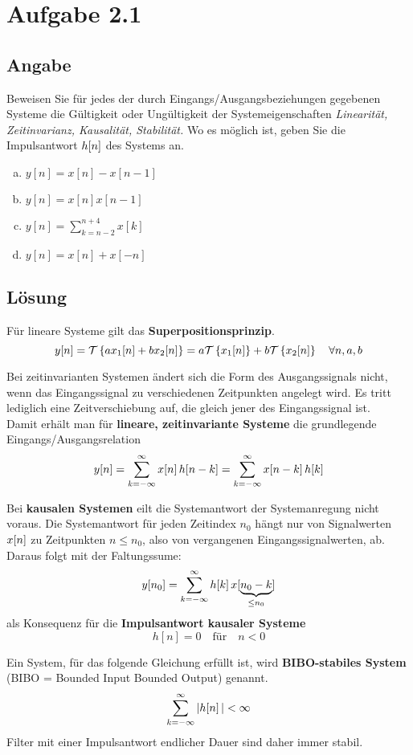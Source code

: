 \section*{Aufgabe 2.1}
\subsection*{Angabe}
Beweisen Sie für jedes der durch Eingangs/Ausgangsbeziehungen gegebenen Systeme die Gültigkeit oder Ungültigkeit der Systemeigenschaften \textit{Linearität, Zeitinvarianz, Kausalität, Stabilität.} Wo es möglich ist, geben Sie die Impulsantwort $h\negthinspace\left[n\right]$ des Systems an.
\begin{enumerate}[a)]
	\item $y[n] = x[n]-x[n-1]$
	\item $y[n] = x[n]x[n-1]$
	\item $\displaystyle{y[n] = \sum_{k=n-2}^{n+4}x[k]}$
	\item $y[n] = x[n] + x[-n]$
\end{enumerate}
\subsection*{Lösung}
\begin{hint}
	Für lineare Systeme gilt das \textbf{Superpositionsprinzip}.\\
	\[
		y\negthinspace\left[n\right] = \mathcal{T} \left\{ ax_1 \negthinspace\left[n\right] + bx_2 \negthinspace\left[n\right] \right\}
		= a\mathcal{T} \left\{ x_1\negthinspace\left[n\right] \right\} + b\mathcal{T} \left\{ x_2 \negthinspace\left[n\right] \right\}
		\quad \forall n,a,b
	\]
\end{hint}
\begin{hint}
	Bei zeitinvarianten Systemen ändert sich die Form des Ausgangssignals nicht, wenn das Eingangssignal zu verschiedenen Zeitpunkten angelegt wird. Es tritt lediglich eine Zeitverschiebung auf, die gleich jener des Eingangssignal ist. \\
	Damit erhält man für \textbf{lineare, zeitinvariante Systeme} die grundlegende\\ Eingangs/Ausgangsrelation
	\[
		y\negthinspace\left[n\right] = \sum_{k=-\infty}^{\infty}x\negthinspace\left[n\right]h\negthinspace\left[n-k\right]
		=\sum_{k=-\infty}^{\infty}x\negthinspace\left[n-k\right]h\negthinspace\left[k\right]
	\]
\end{hint}
\begin{hint}
	Bei \textbf{kausalen Systemen} eilt die Systemantwort der Systemanregung nicht voraus. Die Systemantwort für jeden Zeitindex $n_0$ hängt nur von Signalwerten $x\negthinspace\left[n\right]$ zu Zeitpunkten $n\le n_0$, also von vergangenen Eingangssignalwerten, ab. \\
	Daraus folgt mit der Faltungssume:
	\[
		y\negthinspace\left[n_0\right] = \sum_{k=-\infty}^{\infty} h\negthinspace\left[k\right]x[\underbrace{n_0-k}_{\le n_0}]
	\]
	als Konsequenz für die \textbf{Impulsantwort kausaler Systeme}
	\[
		h[n] = 0 \quad \text{für} \quad n < 0
	\]
\end{hint}
\begin{hint}
	Ein System, für das folgende Gleichung erfüllt ist, wird \textbf{BIBO-stabiles System} (BIBO = Bounded Input Bounded Output) genannt.
	\[
		\sum_{k=-\infty}^{\infty}|h\negthinspace\left[n\right]|<\infty
	\]
	Filter mit einer Impulsantwort endlicher Dauer sind daher immer stabil.
\end{hint}